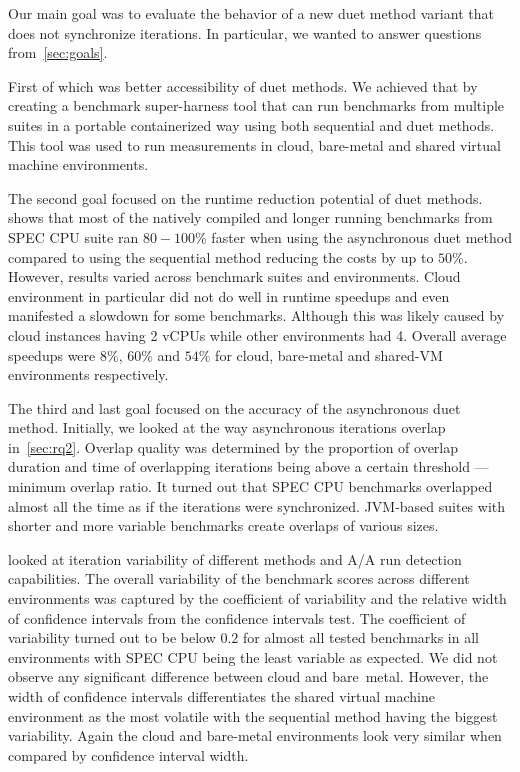 
Our main goal was to evaluate the behavior of a new duet method variant that does not synchronize iterations.
In particular, we wanted to answer questions from~\cref{sec:goals}.

First of which was better accessibility of duet methods.
We achieved that by creating a benchmark super-harness tool that can run benchmarks from multiple suites in a portable containerized way using both sequential and duet methods.
This tool was used to run measurements in cloud, bare-metal and shared virtual machine environments.

The second goal focused on the runtime reduction potential of duet methods.
 shows that most of the natively compiled and longer running benchmarks from SPEC CPU suite ran $80 - 100\%$ faster when using the asynchronous duet method compared to using the sequential method reducing the costs by up to $50\%$.
However, results varied across benchmark suites and environments.
Cloud environment in particular did not do well in runtime speedups and even manifested a slowdown for some benchmarks.
Although this was likely caused by cloud instances having 2 vCPUs while other environments had 4.
Overall average speedups were $8\%$, $60\%$ and $54\%$ for cloud, \mbox{bare-metal} and \mbox{shared-VM} environments respectively.

The third and last goal focused on the accuracy of the asynchronous duet method.
Initially, we looked at the way asynchronous iterations overlap in~\cref{sec:rq2}.
Overlap quality was determined by the proportion of overlap duration and time of overlapping iterations being above a certain threshold --- minimum overlap ratio.
It turned out that SPEC CPU benchmarks overlapped almost all the time as if the iterations were synchronized.
\mbox{JVM-based} suites with shorter and more variable benchmarks create overlaps of various sizes.

 looked at iteration variability of different methods and A/A run detection capabilities.
The overall variability of the benchmark scores across different environments was captured by the coefficient of variability and the relative width of confidence intervals from the confidence intervals test.
The coefficient of variability turned out to be below $0.2$ for almost all tested benchmarks in all environments with SPEC CPU being the least variable as expected.
We did not observe any significant difference between cloud and \mbox{bare metal}.
However, the width of confidence intervals differentiates the shared virtual machine environment as the most volatile with the sequential method having the biggest variability.
Again the cloud and \mbox{bare-metal} environments look very similar when compared by confidence interval width.

